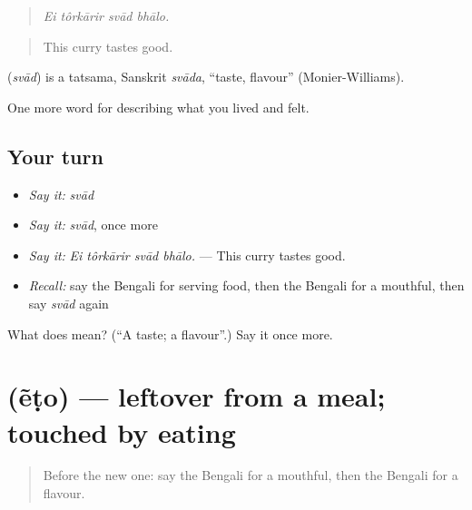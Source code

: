\begin{quote}
   
\end{quote}

\begin{quote}
\emph{Ei tôrkārir svād bhālo.}
\end{quote}

\begin{quote}
This curry tastes good.
\end{quote}

\begin{cousinweb}
\textbf{} (\emph{svād}) is a tatsama, Sanskrit \emph{svāda}, \textquotedblleft{}taste, flavour\textquotedblright{} (Monier-Williams).
\end{cousinweb}

\begin{grammarlens}[title={What you've built}]
One more word for describing what you lived and felt.
\end{grammarlens}

\subsection*{Your turn}
\begin{itemize}
\raggedright
  \item \emph{Say it:} \emph{svād}
  \item \emph{Say it:} \emph{svād}, once more
  \item \emph{Say it:} \emph{Ei tôrkārir svād bhālo.} — This curry tastes good.
  \item \emph{Recall:} say the Bengali for serving food, then the Bengali for a mouthful, then say \emph{svād} again
\end{itemize}

\begin{tcolorbox}[breakable,colback=teal!4,colframe=teal!35!black,title={Before you move on}]
What does  mean? (\textquotedblleft{}A taste; a flavour\textquotedblright{}.) Say it once more.
\end{tcolorbox}
\section[\texorpdfstring{\bn{এঁটো} (ẽṭo)}{এঁটো (ẽṭo)}]{ (ẽṭo) — leftover from a meal; touched by eating}

\label{lesson:BN-C515-eto}



\begin{quote}
Before the new one: say the Bengali for a mouthful, then the Bengali for a flavour.
\end{quote}

